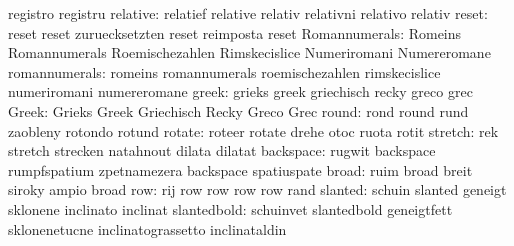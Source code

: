                            registro                  registru
                 relative: relatief                  relative
                           relativ                   relativni
                           relativo                  relativ
                    reset: reset                     reset
                           zuruecksetzten            reset
                           reimposta                 reset
            Romannumerals: Romeins                   Romannumerals
                           Roemischezahlen           Rimskecislice
                           Numeriromani              Numereromane
            romannumerals: romeins                   romannumerals
                           roemischezahlen           rimskecislice
                           numeriromani              numereromane
                    greek: grieks                    greek
                           griechisch                recky
                           greco                     grec
                    Greek: Grieks                    Greek
                           Griechisch                Recky
                           Greco                     Grec
                    round: rond                      round
                           rund                      zaobleny
                           rotondo                   rotund
                   rotate: roteer                    rotate
                           drehe                     otoc
                           ruota                     rotit
                  stretch: rek                       stretch
                           strecken                  natahnout
                           dilata                    dilatat
                backspace: rugwit                    backspace
                           rumpfspatium              zpetnamezera
                           backspace                 spatiuspate %
                    broad: ruim                      broad
                           breit                     siroky
                           ampio                     broad
                      row: rij                       row
                           row                       row
                           row                       rand
                  slanted: schuin                    slanted
                           geneigt                   sklonene
                           inclinato                 inclinat
              slantedbold: schuinvet                 slantedbold
                           geneigtfett               sklonenetucne
                           inclinatograssetto        inclinataldin
